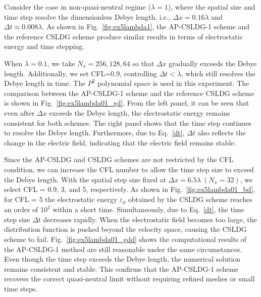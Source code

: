 \documentclass[letterpaper,10pt]{article}
\numberwithin{equation}{section}
\numberwithin{figure}{section}
\numberwithin{table}{section}
\begin{document}
Consider the case in non-quasi-neutral regime ($\lambda=1$), where the spatial size and time step resolve the dimensionless Debye length, i.e., $\Delta x=0.16\lambda$ and $\Delta t \approx 0.008\lambda$.
As shown in Fig.~\ref{fig:ex5lambda1}, the AP-CSLDG-1 scheme and the reference CSLDG scheme produce similar results in terms of electrostatic energy and time stepping.

When $\lambda=0.1$, we take $N_x=256,128,64$ so that $\Delta x$ gradually exceeds the Debye length. 
Additionally, we set CFL=0.9, controlling $\Delta t < \lambda$, which still resolves the Debye length in time.
The $P^2$ polynomial space is used in this experiment.
The comparison between the AP-CSLDG-1 scheme and the reference CSLDG scheme is shown in Fig.~\ref{fig:ex5lambda01_gd}. 
From the left panel, it can be seen that even after $\Delta x$ exceeds the Debye length, the electrostatic energy remains consistent for both schemes.
The right panel shows that the time step continues to resolve the Debye length.
Furthermore, due to Eq.~\eqref{dt}, $\Delta t$ also reflects the change in the electric field, indicating that the electric field remains stable.

Since the AP-CSLDG and CSLDG schemes are not restricted by the CFL condition, we can increase the CFL number to allow the time step size to exceed the Debye length. 
With the spatial step size fixed at $\Delta x=6.5\lambda~(N_x=32)$, we select CFL = 0.9, 3, and 5, respectively. 
As shown in Fig.~\ref{fig:ex5lambda01_bd}, for CFL = 5 the electrostatic energy $\varepsilon_p$ obtained by the CSLDG scheme reaches an order of $10^2$ within a short time. 
Simultaneously, due to Eq.~\eqref{dt}, the time step size $\Delta t$ decreases rapidly. 
When the electrostatic field becomes too large, the distribution function is pushed beyond the velocity space, causing the CSLDG scheme to fail\cite{LIU2020}.
Fig.~\ref{fig:ex5lambda01_gdd} shows the computational results of the AP-CSLDG-1 method are still reasonable under the same circumstances. 
Even though the time step exceeds the Debye length, the numerical solution
remains consistent and stable. 
This confirms that the AP-CSLDG-1 scheme recovers the correct quasi-neutral limit without requiring refined meshes or small time steps.
\end{document}
